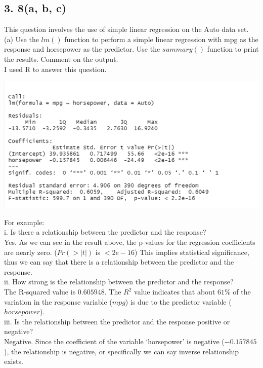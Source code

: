 \documentclass{article}
\begin{document}
\subsection*{3. 8(a, b, c)}
This question involves the use of simple linear regression on the Auto
data set. \\
(a) Use the $lm()$ function to perform a simple linear regression with mpg as the response and horsepower as the predictor. Use the $summary()$ function to print the results. Comment on the output. \\
\indent\indent I used R to answer this question. 
\begin{center}
\includegraphics[scale = 0.46]{3.8.a.png} \\
\end{center}
For example: \\
\indent i. Is there a relationship between the predictor and the response? \\
\indent\indent Yes. As we can see in the result above, the p-values for the regression coefficients are nearly zero. ($Pr(>|t|)$ is $<2e-16$) This implies statistical significance, thus we can say that there is a relationship between the predictor and the response. \\
\indent ii. How strong is the relationship between the predictor and the response? \\
\indent\indent The R-squared value is $0.605948$. The $R^2$ value indicates that about $61\%$ of the variation in the response variable ($mpg$) is due to the predictor variable ($horsepower$). \\
\indent iii. Is the relationship between the predictor and the response
positive or negative? \\
\indent\indent Negative. Since the coefficient of the variable `horsepower' is negative ($-0.157845$), the relationship is negative, or specifically we can say inverse relationship exists. \\
\end{document}
